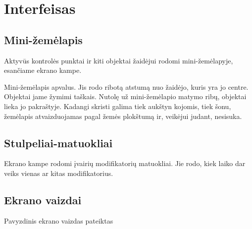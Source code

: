 \section{Interfeisas}

\subsection{Mini-žemėlapis}

Aktyvūs kontrolės punktai ir kiti objektai žaidėjui rodomi mini-žemėlapyje, esančiame ekrano kampe.

Mini-žemėlapis apvalus.
Jis rodo ribotą atstumą nuo žaidėjo, kuris yra jo centre.
Objektai jame žymimi taškais.
Nutolę už mini-žemėlapio matymo ribų, objektai lieka jo pakraštyje.
Kadangi skristi galima tiek aukštyn kojomis, tiek šonu, žemėlapis atvaizduojamas pagal žemės plokštumą ir, veikėjui judant, nesisuka.

\subsection{Stulpeliai-matuokliai}

Ekrano kampe rodomi įvairių modifikatorių matuokliai.
Jie rodo, kiek laiko dar veiks vienas ar kitas modifikatorius.

\subsection{Ekrano vaizdai}

Pavyzdinis ekrano vaizdas pateiktas 

